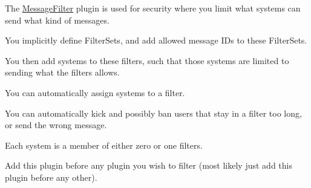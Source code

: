 The \hyperlink{class_rak_net_1_1_message_filter}{Message\-Filter} plugin is used for security where you limit what systems can send what kind of messages.\par
 You implicitly define Filter\-Sets, and add allowed message I\-Ds to these Filter\-Sets.\par
 You then add systems to these filters, such that those systems are limited to sending what the filters allows.\par
 You can automatically assign systems to a filter.\par
 You can automatically kick and possibly ban users that stay in a filter too long, or send the wrong message.\par
 Each system is a member of either zero or one filters.\par
 Add this plugin before any plugin you wish to filter (most likely just add this plugin before any other). 

